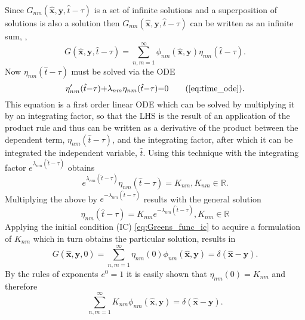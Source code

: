 \documentclass[\main/thesis.tex]{subfiles}
\begin{document}
Since $G_{nm}(\boldsymbol{\hat{x}}, \boldsymbol{y}, \hat{t}{-}\tau)$ is a set of infinite solutions and a superposition of 
solutions is also a solution then $G_{nm}(\boldsymbol{\hat{x}}, \boldsymbol{y}, \hat{t}{-}\tau)$ can be written as an 
infinite sum, \ie,
\begin{equation}
	G(\boldsymbol{\hat{x}}, \boldsymbol{y}, \hat{t}{-}\tau) {=} \sum_{n,m {=} 1}^{\infty} \phi_{nm}(\boldsymbol{\hat{x}}, \boldsymbol{y}) \eta_{nm}(\hat{t}{-}\tau).
	\label{eq:variable_sol}
\end{equation}
Now $\eta_{nm}(\hat{t}{-}\tau)$ must be solved via the ODE
\begin{equation*}
	\eta'_{nm}(\hat{t}{-}\tau) {+} \lambda_{nm} \eta_{nm}(\hat{t}{-}\tau) {=} 0 \tag{\ref{eq:time_ode}}.
\end{equation*}
This equation is a first order linear ODE which can be solved by multiplying it 
by an integrating factor, so that the LHS is the result of an application of the 
product rule and thus can be written as a derivative of the product between the 
dependent term, $\eta_{nm}(\hat{t}{-}\tau)$, and the integrating factor, after which it can 
be integrated \wrt the independent variable, $\hat{t}$. Using this technique with the 
integrating factor $e^{\lambda_{nm} (\hat{t}{-}\tau)}$ obtains  
\begin{equation*}
	e^{\lambda_{nm} (\hat{t}{-}\tau)} \eta_{nm}(\hat{t}{-}\tau) {=} K_{nm}, 
	K_{nm} {\in} \mathbb{R}.
\end{equation*}
Multiplying the above by $e^{\minus \lambda_{nm} (\hat{t}{-}\tau)}$ results with the general solution
\begin{equation}
	\eta_{nm}(\hat{t}{-}\tau) {=} K_{nm} e^{\minus \lambda_{nm} (\hat{t}{-}\tau)},
	K_{nm} {\in} \mathbb{R}
	\label{eq:time_depen_sol}
\end{equation}
Applying the initial condition (IC) \eqref{eq:Greens_func_ic} to acquire a 
formulation of $K_{nm}$ which in turn obtains the particular solution, results in
\begin{equation*}
	G(\boldsymbol{\hat{x}}, \boldsymbol{y}, 0) {=} \sum_{n,m {=} 1}^{\infty} \eta_{nm}(0) \phi_{nm}(\boldsymbol{\hat{x}}, \boldsymbol{y})
	                                           {=} \delta(\boldsymbol{\hat{x}} {-} \boldsymbol{y}).
\end{equation*}
By the rules of exponents $e^0 {=} 1$ it is easily shown that $\eta_{nm}(0) {=} K_{nm}$ and therefore
\begin{equation*}
    \sum_{n,m {=} 1}^{\infty} K_{nm} \phi_{nm}(\boldsymbol{\hat{x}}, \boldsymbol{y}) {=} \delta(\boldsymbol{\hat{x}} {-} \boldsymbol{y}).
\end{equation*}
\end{document}
